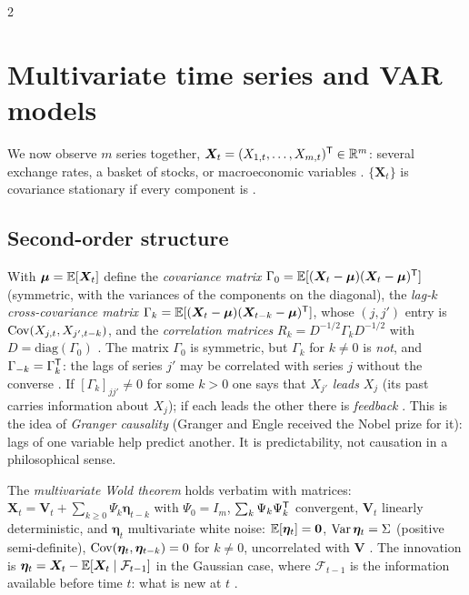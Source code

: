 \begin{paracol}{2}
\section{Multivariate time series and VAR models}\label{ch09:sec-var}

We now observe $m$ series together, $\bm X_t=(X_{1,t},\dots,X_{m,t})^{\mathsf T}\in\mathbb{R}^m$: several exchange rates, a basket of stocks, or
macroeconomic variables . $\{\bm X_t\}$ is covariance stationary if every component is
.

\subsection{Second-order structure}\label{ch09:sec-multi}
With $\bm\mu=\mathbb{E}[\bm X_t]$ define the \emph{covariance matrix} $\Gamma_0=\mathbb{E}[(\bm X_t-\bm\mu)(\bm X_t-\bm\mu)^{\mathsf T}]$ (symmetric, with the
variances of the components on the diagonal), the \emph{lag-$k$ cross-covariance matrix}
$\Gamma_k=\mathbb{E}[(\bm X_t-\bm\mu)(\bm X_{t-k}-\bm\mu)^{\mathsf T}]$, whose $(j,j')$ entry is $\operatorname{Cov}(X_{j,t},X_{j',t-k})$, and the
\emph{correlation matrices} $R_k=D^{-1/2}\Gamma_kD^{-1/2}$ with $D=\mathrm{diag}(\Gamma_0)$
. The matrix $\Gamma_0$ is symmetric, but $\Gamma_k$ for $k\ne0$ is
\emph{not}, and $\Gamma_{-k}=\Gamma_k^{\mathsf T}$: the lags of series $j'$ may be correlated with series $j$ without the converse
. If $[\Gamma_k]_{jj'}\ne0$ for some $k>0$ one says that $X_{j'}$ \emph{leads} $X_j$ (its past carries information
about $X_j$); if each leads the other there is \emph{feedback} . This is the idea of
\emph{Granger causality} (Granger and Engle received the Nobel prize for it): lags of one variable help predict another. It is
predictability, not causation in a philosophical sense.

The \emph{multivariate Wold theorem} holds verbatim with matrices:
$\bm X_t=\bm V_t+\sum_{k\ge0}\Psi_k\bm\eta_{t-k}$ with $\Psi_0=I_m$, $\sum_k\Psi_k\Psi_k^{\mathsf T}$ convergent, $\bm V_t$ linearly
deterministic, and $\bm\eta_t$ multivariate white noise: $\mathbb{E}[\bm\eta_t]=\bm 0$, $\operatorname{Var}\bm\eta_t=\Sigma$ (positive semi-definite),
$\operatorname{Cov}(\bm\eta_t,\bm\eta_{t-k})=0$ for $k\ne0$, uncorrelated with $\bm V$ . The
innovation is $\bm\eta_t=\bm X_t-\mathbb{E}[\bm X_t\mid\mathcal F_{t-1}]$ in the Gaussian case, where $\mathcal F_{t-1}$ is the information available
before time $t$: what is new at $t$ .


\end{paracol}
